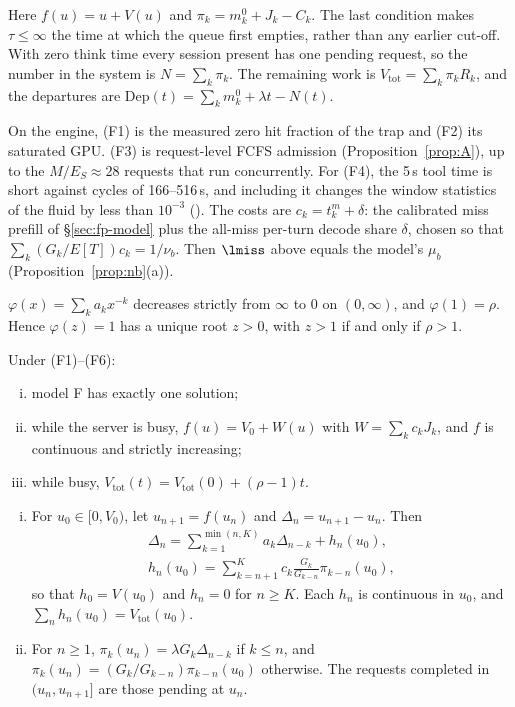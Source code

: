 Here $f(u)=u+V(u)$ and $\pi_k=m^0_k+J_k-C_k$. The last condition makes $\tau\le\infty$ the time at which the queue first
empties, rather than any earlier cut-off. With zero think time every
session present has one pending request, so the number in the system is $N=\sum_k\pi_k$. The remaining work is
$V_{\mathrm{tot}}=\sum_k\pi_kR_k$, and the departures are $\mathrm{Dep}(t)=\sum_km^0_k+\lambda t-N(t)$.

On the engine, (F1) is the measured zero hit fraction of the trap and (F2) its saturated GPU. (F3) is request-level FCFS
admission (Proposition~\ref{prop:A}), up to the $M/E_S\approx28$ requests that run concurrently. For (F4), the 5\,s tool
time is short against cycles of 166--516\,s, and including it changes the window statistics of the fluid by less than
$10^{-3}$ (). The costs are $c_k=t^m_k+\delta$: the calibrated miss prefill of
\S\ref{sec:fp-model} plus the all-miss per-turn decode share $\delta$, chosen so that $\sum_k(G_k/E[T])c_k=1/\nu_b$. Then
$\lmiss$ above equals the model's $\mu_b$ (Proposition~\ref{prop:nb}(a)).

\begin{lemma}\label{lem:perron}
$\varphi(x)=\sum_ka_kx^{-k}$ decreases strictly from $\infty$ to $0$ on $(0,\infty)$, and $\varphi(1)=\rho$. Hence
$\varphi(z)=1$ has a unique root $z>0$, with $z>1$ if and only if $\rho>1$.
\end{lemma}

\begin{lemma}\label{lem:orbit}
Under (F1)--(F6):
\begin{enumerate}[(i),leftmargin=*,nosep]
\item model F has exactly one solution;
\item while the server is busy, $f(u)=V_0+W(u)$ with $W=\sum_kc_kJ_k$, and $f$ is continuous and strictly increasing;
\item while busy, $V_{\mathrm{tot}}(t)=V_{\mathrm{tot}}(0)+(\rho-1)t$.
\end{enumerate}
\begin{enumerate}[(i),leftmargin=*,nosep,resume]
\item For $u_0\in[0,V_0)$, let $u_{n+1}=f(u_n)$ and $\Delta_n=u_{n+1}-u_n$. Then
\begin{gather*}
\Delta_n=\sum_{k=1}^{\min(n,K)}a_k\Delta_{n-k}+h_n(u_0),\\
h_n(u_0)=\sum_{k=n+1}^{K}c_k\frac{G_k}{G_{k-n}}\pi_{k-n}(u_0),
\end{gather*}
so that $h_0=V(u_0)$ and $h_n=0$ for $n\ge K$. Each $h_n$ is continuous in $u_0$, and $\sum_nh_n(u_0)=V_{\mathrm{tot}}(u_0)$.
\item For $n\ge1$, $\pi_k(u_n)=\lambda G_k\Delta_{n-k}$ if $k\le n$, and $\pi_k(u_n)=(G_k/G_{k-n})\pi_{k-n}(u_0)$ otherwise.
The requests completed in $(u_n,u_{n+1}]$ are those pending at $u_n$.
\end{enumerate}
\end{lemma}


